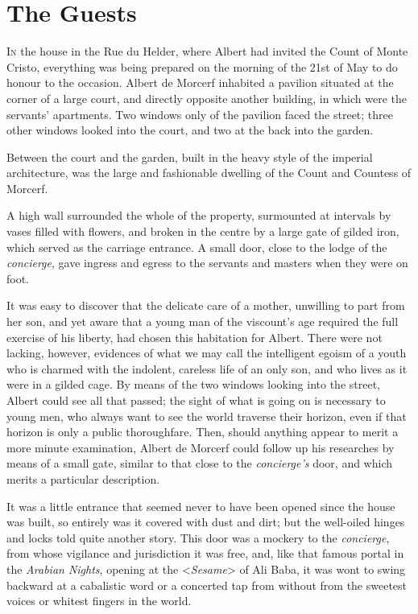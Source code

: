 \chapter{The Guests} 

 \lettrine{I}{n} the house in the Rue du Helder, where Albert had invited the Count of Monte Cristo, everything was being prepared on the morning of the 21st of May to do honour to the occasion. Albert de Morcerf inhabited a pavilion situated at the corner of a large court, and directly opposite another building, in which were the servants' apartments. Two windows only of the pavilion faced the street; three other windows looked into the court, and two at the back into the garden. 

 Between the court and the garden, built in the heavy style of the imperial architecture, was the large and fashionable dwelling of the Count and Countess of Morcerf. 

 A high wall surrounded the whole of the property, surmounted at intervals by vases filled with flowers, and broken in the centre by a large gate of gilded iron, which served as the carriage entrance. A small door, close to the lodge of the \textit{concierge}, gave ingress and egress to the servants and masters when they were on foot. 

 It was easy to discover that the delicate care of a mother, unwilling to part from her son, and yet aware that a young man of the viscount's age required the full exercise of his liberty, had chosen this habitation for Albert. There were not lacking, however, evidences of what we may call the intelligent egoism of a youth who is charmed with the indolent, careless life of an only son, and who lives as it were in a gilded cage. By means of the two windows looking into the street, Albert could see all that passed; the sight of what is going on is necessary to young men, who always want to see the world traverse their horizon, even if that horizon is only a public thoroughfare. Then, should anything appear to merit a more minute examination, Albert de Morcerf could follow up his researches by means of a small gate, similar to that close to the \textit{concierge's} door, and which merits a particular description. 

 It was a little entrance that seemed never to have been opened since the house was built, so entirely was it covered with dust and dirt; but the well-oiled hinges and locks told quite another story. This door was a mockery to the \textit{concierge}, from whose vigilance and jurisdiction it was free, and, like that famous portal in the \textit{Arabian Nights}, opening at the <\textit{Sesame}> of Ali Baba, it was wont to swing backward at a cabalistic word or a concerted tap from without from the sweetest voices or whitest fingers in the world. 

